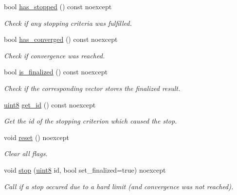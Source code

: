 \begin{DoxyCompactItemize}
\item 
bool \hyperlink{classgko_1_1stopping__status_af374c7164dcf3adb27a15a669714abcc}{has\+\_\+stopped} () const noexcept
\begin{DoxyCompactList}\small\item\em Check if any stopping criteria was fulfilled. \end{DoxyCompactList}\item 
bool \hyperlink{classgko_1_1stopping__status_a825e74142fdaf17e9570d06db0b378db}{has\+\_\+converged} () const noexcept
\begin{DoxyCompactList}\small\item\em Check if convergence was reached. \end{DoxyCompactList}\item 
bool \hyperlink{classgko_1_1stopping__status_a7c8b094d37449098ca4ddb1f4bbf10bd}{is\+\_\+finalized} () const noexcept
\begin{DoxyCompactList}\small\item\em Check if the corresponding vector stores the finalized result. \end{DoxyCompactList}\item 
\hyperlink{namespacegko_a3950fc3732811a8563484e5098c31531}{uint8} \hyperlink{classgko_1_1stopping__status_ae3c4d0e7a01f4e1892a09f418ea0907d}{get\+\_\+id} () const noexcept
\begin{DoxyCompactList}\small\item\em Get the id of the stopping criterion which caused the stop. \end{DoxyCompactList}\item 
\mbox{\label{classgko_1_1stopping__status_afb227192722d1c20d11ae15719e1f930}} 
void \hyperlink{classgko_1_1stopping__status_afb227192722d1c20d11ae15719e1f930}{reset} () noexcept
\begin{DoxyCompactList}\small\item\em Clear all flags. \end{DoxyCompactList}\item 
void \hyperlink{classgko_1_1stopping__status_ab13d4f214328c9574fdef6168c671de0}{stop} (\hyperlink{namespacegko_a3950fc3732811a8563484e5098c31531}{uint8} id, bool set\+\_\+finalized=true) noexcept
\begin{DoxyCompactList}\small\item\em Call if a stop occured due to a hard limit (and convergence was not reached). \end{DoxyCompactList}\item 

\end{DoxyCompactItemize}
